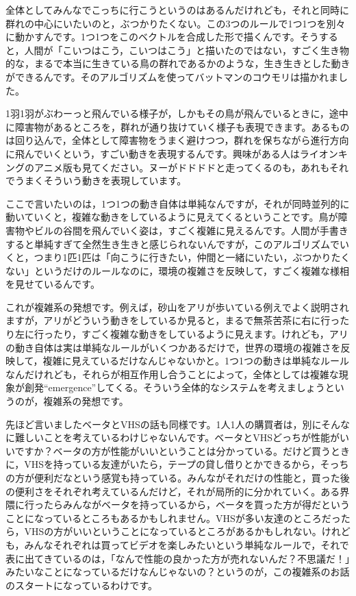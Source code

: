 \documentclass{ltjsbook}
\begin{document}
全体としてみんなでこっちに行こうというのはあるんだけれども，それと同時に群れの中心にいたいのと，ぶつかりたくない。この3つのルールで1つ1つを別々に動かすんです。1つ1つをこのベクトルを合成した形で描くんです。そうすると，人間が「こいつはこう，こいつはこう」と描いたのではない，すごく生き物的な，まるで本当に生きている鳥の群れであるかのような，生き生きとした動きができるんです。そのアルゴリズムを使ってバットマンのコウモリは描かれました。

1羽1羽がぶわーっと飛んでいる様子が，しかもその鳥が飛んでいるときに，途中に障害物があるところを，群れが通り抜けていく様子も表現できます。あるものは回り込んで，全体として障害物をうまく避けつつ，群れを保ちながら進行方向に飛んでいくという，すごい動きを表現するんです。興味がある人はライオンキングのアニメ版も見てください。ヌーがドドドドと走ってくるのも，あれもそれでうまくそういう動きを表現しています。

ここで言いたいのは，1つ1つの動き自体は単純なんですが，それが同時並列的に動いていくと，複雑な動きをしているように見えてくるということです。鳥が障害物やビルの谷間を飛んでいく姿は，すごく複雑に見えるんです。人間が手書きすると単純すぎて全然生き生きと感じられないんですが，このアルゴリズムでいくと，つまり1匹1匹は「向こうに行きたい，仲間と一緒にいたい，ぶつかりたくない」というだけのルールなのに，環境の複雑さを反映して，すごく複雑な様相を見せているんです。

これが複雑系の発想です。例えば，砂山をアリが歩いている例えでよく説明されますが，アリがどういう動きをしているか見ると，まるで無茶苦茶に右に行ったり左に行ったり，すごく複雑な動きをしているように見えます。けれども，アリの動き自体は実は単純なルールがいくつかあるだけで，世界の環境の複雑さを反映して，複雑に見えているだけなんじゃないかと。1つ1つの動きは単純なルールなんだけれども，それらが相互作用し合うことによって，全体としては複雑な現象が創発``emergence''してくる。そういう全体的なシステムを考えましょうというのが，複雑系の発想です。

先ほど言いましたベータとVHSの話も同様です。1人1人の購買者は，別にそんなに難しいことを考えているわけじゃないんです。ベータとVHSどっちが性能がいいですか？ベータの方が性能がいいということは分かっている。だけど買うときに，VHSを持っている友達がいたら，テープの貸し借りとかできるから，そっちの方が便利だなという感覚も持っている。みんながそれだけの性能と，買った後の便利さをそれぞれ考えているんだけど，それが局所的に分かれていく。ある界隈に行ったらみんながベータを持っているから，ベータを買った方が得だということになっているところもあるかもしれません。VHSが多い友達のところだったら，VHSの方がいいということになっているところがあるかもしれない。けれども，みんなそれぞれは買ってビデオを楽しみたいという単純なルールで，それで表に出てきているのは，「なんで性能の良かった方が売れないんだ？不思議だ！」みたいなことになっているだけなんじゃないの？というのが，この複雑系のお話のスタートになっているわけです。
\end{document}
